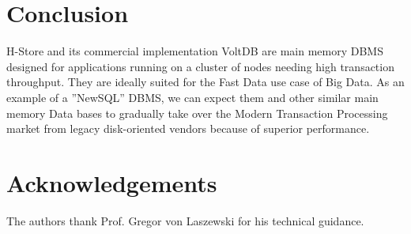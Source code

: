 \documentclass[9pt,twocolumn,twoside]{../../styles/osajnl}
\begin{document}
\section{Conclusion}
H-Store and its commercial implementation VoltDB are main memory DBMS designed for applications running on a cluster of nodes needing high transaction throughput. They are ideally suited for the Fast Data use case of Big Data. As an example of a ”NewSQL” DBMS, we
can expect them and other similar main memory Data bases to gradually take over the Modern Transaction Processing market from legacy disk-oriented vendors
because of superior performance.

\section*{Acknowledgements}

The authors thank Prof. Gregor von Laszewski for his technical guidance.


\end{document}
